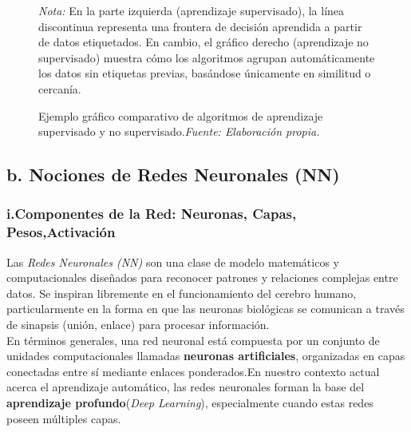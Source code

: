 \documentclass[11pt]{article} %
\begin{document}
\begin{figure}[H]

\caption{Ejemplo gráfico comparativo de algoritmos de aprendizaje supervisado y no supervisado.\textit{Fuente: Elaboración propia.}}
\label{fig:aprendizaje-supervisado-no-supervisado}
\vspace{2mm}

\small\textit{Nota:} En la parte izquierda (aprendizaje supervisado), la línea discontinua representa una frontera de decisión aprendida a partir de datos etiquetados. En cambio, el gráfico derecho (aprendizaje no supervisado) muestra cómo los algoritmos agrupan automáticamente los datos sin etiquetas previas, basándose únicamente en similitud o cercanía.

\end{figure}
\subsection{b. Nociones de Redes Neuronales (NN)}
\vspace{5pt}

\subsubsection{i.Componentes de la Red: Neuronas, Capas, Pesos,Activación} 
\vspace{3pt}
Las \textit{Redes Neuronales (NN)} son una clase de modelo matemáticos y computacionales diseñados para reconocer patrones y relaciones complejas entre datos. Se inspiran libremente en el funcionamiento del cerebro humano, particularmente en la forma en que las neuronas biológicas se comunican a través de sinapsis (unión, enlace) para procesar información.\\
En términos generales, una red neuronal está compuesta por un conjunto de unidades computacionales llamadas \textbf{neuronas artificiales}, organizadas en capas conectadas entre sí mediante enlaces ponderados.En nuestro contexto actual acerca el aprendizaje automático, las redes neuronales forman la base del \textbf{aprendizaje profundo}(\textit{Deep Learning}), especialmente cuando estas redes poseen múltiples capas.
\end{document}
